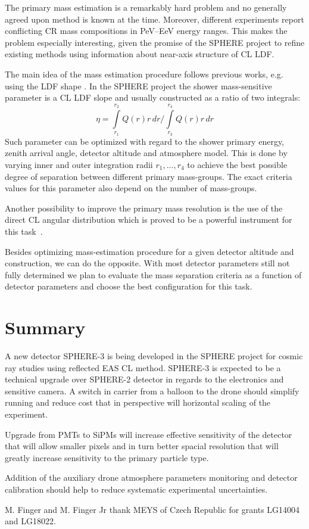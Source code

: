 \documentclass[a4paper,11pt]{article}
\begin{document}
The primary mass estimation is a remarkably hard problem and no generally agreed upon method is known at the time. Moreover, different experiments report conflicting CR mass compositions in PeV--EeV energy ranges. This makes the problem especially interesting, given the promise of the SPHERE project to refine existing methods using information about near-axis structure of CL LDF.

The main idea of the mass estimation procedure follows previous works, e.g. using the LDF shape \cite{Anokhina2009}. In the SPHERE project the shower mass-sensitive parameter is a CL LDF slope and usually constructed as a ratio of two integrals:
\begin{equation}
    \eta = {\int\limits_{r_1}^{r_2}Q(r)r\,dr} \Big / {\int\limits_{r_3}^{r_4}Q(r)r\,dr}
\end{equation}
Such parameter can be optimized with regard to the shower primary energy, zenith arrival angle, detector altitude and atmosphere model. This is done by varying inner and outer integration radii $r_1, ..., r_4$ to achieve the best possible degree of separation between different primary mass-groups. The exact criteria values for this parameter also depend on the number of mass-groups.

Another possibility to improve the primary mass resolution is the use of the direct CL angular distribution which is proved to be a powerful instrument for this task~\cite{Gal18a}.

Besides optimizing mass-estimation procedure for a given detector altitude and construction, we can do the opposite. With most detector parameters still not fully determined we plan to evaluate the mass separation criteria as a function of detector parameters and choose the best configuration for this task.

\section{Summary}
A new detector SPHERE-3 is being developed in the SPHERE project for cosmic ray studies using reflected EAS CL method. SPHERE-3 is expected to be a technical upgrade over SPHERE-2 detector in regards to the electronics and sensitive camera. A switch in carrier from a balloon to the drone should simplify running and reduce cost that in perspective will horizontal scaling of the experiment. 

Upgrade from PMTs to SiPMs will increase effective sensitivity of the detector that will allow smaller pixels and in turn better spacial resolution that will greatly increase sensitivity to the primary particle type.

Addition of the auxiliary drone atmosphere parameters monitoring and detector calibration should help to reduce systematic experimental uncertainties.

\acknowledgments
M. Finger and M. Finger Jr thank MEYS of Czech Republic for grants LG14004 and LG18022.



\end{document}
